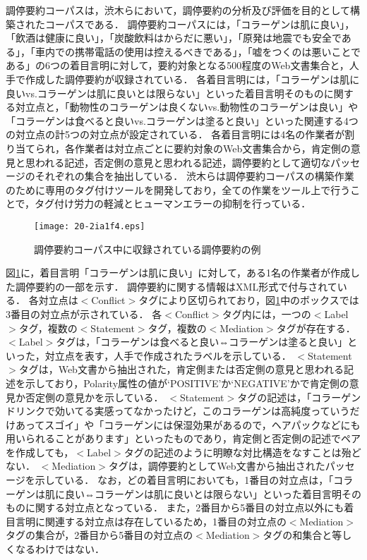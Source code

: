 \documentclass[japanese]{jnlp_1.4}
\begin{document}
調停要約コーパスは，渋木ら\cite{Shibuki2011b}において，調停要約の分析及び評価を目的として構築されたコーパスである．
調停要約コーパスには，「コラーゲンは肌に良い」，「飲酒は健康に良い」，「炭酸飲料はからだに悪い」，「原発は地震でも安全である」，「車内での携帯電話の使用は控えるべきである」，「嘘をつくのは悪いことである」の6つの着目言明に対して，要約対象となる500程度のWeb文書集合と，人手で作成した調停要約が収録されている．
各着目言明には，「コラーゲンは肌に良いvs.コラーゲンは肌に良いとは限らない」といった着目言明そのものに関する対立点と，「動物性のコラーゲンは良くないvs.動物性のコラーゲンは良い」や「コラーゲンは食べると良いvs.コラーゲンは塗ると良い」といった関連する4つの対立点の計5つの対立点が設定されている．
各着目言明には4名の作業者が割り当てられ，各作業者は対立点ごとに要約対象のWeb文書集合から，肯定側の意見と思われる記述，否定側の意見と思われる記述，調停要約として適切なパッセージのそれぞれの集合を抽出している．
渋木ら\cite{Shibuki2011b}は調停要約コーパスの構築作業のために専用のタグ付けツールを開発しており，全ての作業をツール上で行うことで，タグ付け労力の軽減とヒューマンエラーの抑制を行っている．

\begin{figure}[t]
\begin{center}
\texttt{[image: 20-2ia1f4.eps]}
\end{center}
\caption{調停要約コーパス中に収録されている調停要約の例}
\label{fg:corpus}
\end{figure}

図\ref{fg:corpus}に，着目言明「コラーゲンは肌に良い」に対して，ある1名の作業者が作成した調停要約の一部を示す．
調停要約に関する情報はXML形式で付与されている．
各対立点は{\sf$<$Conflict$>$}タグにより区切られており，図\ref{fg:corpus}中のボックスでは3番目の対立点が示されている．
各{\sf$<$Conflict$>$}タグ内には，一つの{\sf$<$Label$>$}タグ，複数の{\sf$<$Statement$>$}タグ，複数の{\sf$<$Mediation$>$}タグが存在する．
{\sf$<$Label$>$}タグは，「コラーゲンは食べると良い⇔コラーゲンは塗ると良い」といった，対立点を表す，人手で作成されたラベルを示している．
{\sf$<$Statement$>$}タグは，Web文書から抽出された，肯定側または否定側の意見と思われる記述を示しており，{\sf Polarity}属性の値が{\sf`POSITIVE'}か{\sf`NEGATIVE'}かで肯定側の意見か否定側の意見かを示している．
{\sf$<$Statement$>$}タグの記述は，「コラーゲンドリンクで効いてる実感ってなかったけど，このコラーゲンは高純度っていうだけあってスゴイ」や「コラーゲンには保湿効果があるので，ヘアパックなどにも用いられることがあります」といったものであり，肯定側と否定側の記述でペアを作成しても，{\sf$<$Label$>$}タグの記述のように明瞭な対比構造をなすことは殆どない．
{\sf$<$Mediation$>$}タグは，調停要約としてWeb文書から抽出されたパッセージを示している．
なお，どの着目言明においても，1番目の対立点は，「コラーゲンは肌に良い⇔コラーゲンは肌に良いとは限らない」といった着目言明そのものに関する対立点となっている．
また，2番目から5番目の対立点以外にも着目言明に関連する対立点は存在しているため，1番目の対立点の{\sf$<$Mediation$>$}タグの集合が，2番目から5番目の対立点の{\sf$<$Mediation$>$}タグの和集合と等しくなるわけではない．
\end{document}
